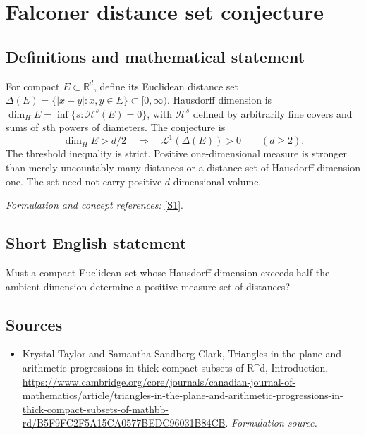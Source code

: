 \documentclass[11pt]{article}
\begin{document}
\section*{\texorpdfstring{Falconer distance set conjecture}{Falconer distance set conjecture}}\label{209}
\subsection{Definitions and mathematical statement}
For compact $E\subset{\mathbb{R}}^d$, define its Euclidean distance set
$\Delta(E)=\{|x-y|:x,y\in E\}\subset[0,\infty)$. Hausdorff dimension is
$\dim_H E=\inf\{s:\mathcal H^s(E)=0\}$, with $\mathcal H^s$ defined by arbitrarily fine covers and sums of $s$th powers of diameters. The conjecture is
\[
 \dim_H E>d/2\quad\Longrightarrow\quad \mathcal L^1(\Delta(E))>0
 \qquad(d\ge2).
\]
The threshold inequality is strict. Positive one-dimensional measure is stronger than merely uncountably many distances or a distance set of Hausdorff dimension one. The set need not carry positive $d$-dimensional volume.
\par\smallskip\textit{Formulation and concept references:} \href{https://www.cambridge.org/core/journals/canadian-journal-of-mathematics/article/triangles-in-the-plane-and-arithmetic-progressions-in-thick-compact-subsets-of-mathbb-rd/B5F9FC2F5A15CA0577BEDC96031B84CB}{[S1]}.

\subsection{Short English statement}
Must a compact Euclidean set whose Hausdorff dimension exceeds half the ambient dimension determine a positive-measure set of distances?
\subsection{Sources}
\begin{itemize}
\item[S1]Krystal Taylor and Samantha Sandberg-Clark, Triangles in the plane and arithmetic progressions in thick compact subsets of R\textasciicircum{}d, Introduction.
\url{https://www.cambridge.org/core/journals/canadian-journal-of-mathematics/article/triangles-in-the-plane-and-arithmetic-progressions-in-thick-compact-subsets-of-mathbb-rd/B5F9FC2F5A15CA0577BEDC96031B84CB}.
\textit{Formulation source.}
\end{itemize}
\end{document}
